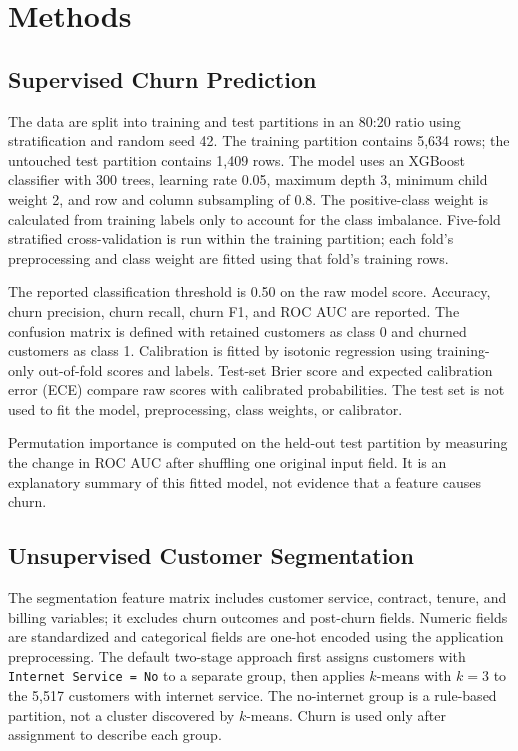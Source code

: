 \documentclass[conference]{IEEEtran}
\begin{document}
\section{Methods}
\subsection{Supervised Churn Prediction}
The data are split into training and test partitions in an 80:20 ratio using stratification and random seed 42. The training partition contains 5,634 rows; the untouched test partition contains 1,409 rows. The model uses an XGBoost classifier with 300 trees, learning rate 0.05, maximum depth 3, minimum child weight 2, and row and column subsampling of 0.8. The positive-class weight is calculated from training labels only to account for the class imbalance. Five-fold stratified cross-validation is run within the training partition; each fold's preprocessing and class weight are fitted using that fold's training rows.

The reported classification threshold is 0.50 on the raw model score. Accuracy, churn precision, churn recall, churn F1, and ROC AUC are reported. The confusion matrix is defined with retained customers as class 0 and churned customers as class 1. Calibration is fitted by isotonic regression using training-only out-of-fold scores and labels. Test-set Brier score and expected calibration error (ECE) compare raw scores with calibrated probabilities. The test set is not used to fit the model, preprocessing, class weights, or calibrator.

Permutation importance is computed on the held-out test partition by measuring the change in ROC AUC after shuffling one original input field. It is an explanatory summary of this fitted model, not evidence that a feature causes churn.

\subsection{Unsupervised Customer Segmentation}
The segmentation feature matrix includes customer service, contract, tenure, and billing variables; it excludes churn outcomes and post-churn fields. Numeric fields are standardized and categorical fields are one-hot encoded using the application preprocessing. The default two-stage approach first assigns customers with \texttt{Internet Service = No} to a separate group, then applies $k$-means with $k=3$ to the 5,517 customers with internet service. The no-internet group is a rule-based partition, not a cluster discovered by $k$-means. Churn is used only after assignment to describe each group.
\end{document}
